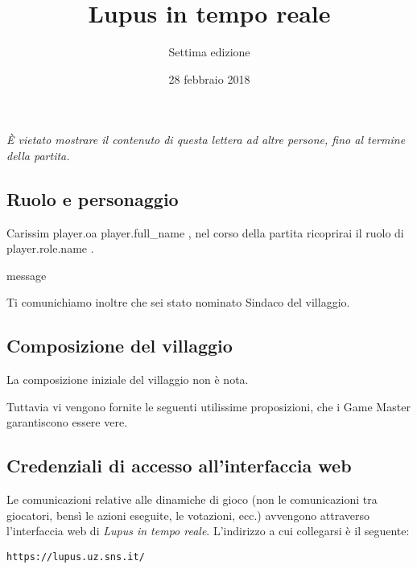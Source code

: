 \documentclass[a4paper,10pt]{article}
\title{Lupus in tempo reale}
\author{Settima edizione}
\date{28 febbraio 2018}
\begin{document}

\maketitle

\emph{È vietato mostrare il contenuto di questa lettera ad altre persone, fino al termine della partita.}


\subsection*{Ruolo e personaggio}
Carissim{{ player.oa }} {{ player.full_name }}, nel corso della partita ricoprirai il ruolo di {{ player.role.name }}.

{%

{%
    {%
        {{ message }}
    {%
{%

{%
    Ti comunichiamo inoltre che sei stato nominato Sindaco del villaggio.
{%


\subsection*{Composizione del villaggio}
La composizione iniziale del villaggio non è nota.
{%
Tuttavia vi vengono fornite le seguenti utilissime proposizioni, che i Game Master garantiscono essere vere.
\nopagebreak
{}
{%



\subsection*{Credenziali di accesso all'interfaccia web}

Le comunicazioni relative alle dinamiche di gioco (non le comunicazioni tra giocatori, bensì le azioni eseguite, le votazioni, ecc.) avvengono attraverso l'interfaccia web di \emph{Lupus in tempo reale}.
L'indirizzo a cui collegarsi è il seguente:
\nopagebreak
\begin{center}
    \verb|https://lupus.uz.sns.it/|
\end{center}

}}}}}}}}}
\end{document}
